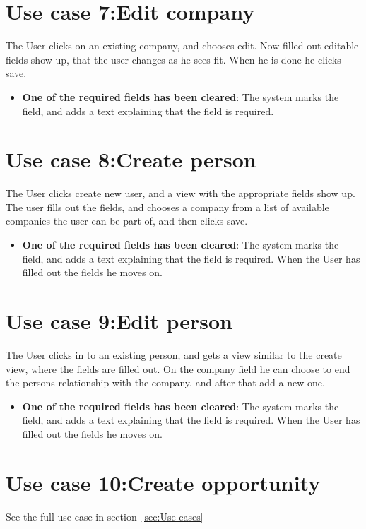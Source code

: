 \section{Use case 7:Edit company }
The User clicks on an existing company, and chooses edit. Now filled out
editable fields show up, that the user changes as he sees fit. When he is done
he clicks save. 
\begin{itemize}
  \item \textbf{One of the required fields has been cleared}: The system marks
    the field, and adds a text explaining that the field is required. 
\end{itemize}

\section{Use case 8:Create person }
The User clicks create new user, and a view with the appropriate fields show up.
The user fills out the fields, and chooses a company from a list of available
companies the user can be part of, and then clicks save. 

\begin{itemize}
  \item \textbf{One of the required fields has been cleared}: The system marks
    the field, and adds a text explaining that the field is required. When the
    User has filled out the fields he moves on. 
\end{itemize}

\section{Use case 9:Edit person }
The User clicks in to an existing person, and gets a view similar to the create
view, where the fields are filled out. On the company field he can choose to end
the persons relationship with the company, and after that add a new one. 

\begin{itemize} 
  \item \textbf{One of the required fields has been cleared}: The system marks
    the field, and adds a text explaining that the field is required. When the
    User has filled out the fields he moves on. 
\end{itemize}

\section{Use case 10:Create opportunity }
See the full use case in section~\ref{sec:Use cases}


